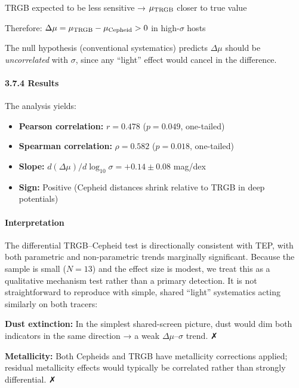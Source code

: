 \documentclass[
]{article}
\begin{document}
TRGB expected to be less sensitive → \(\mu_{\rm TRGB}\) closer to true
value

Therefore: \(\Delta\mu = \mu_{\rm TRGB} - \mu_{\rm Cepheid} > 0\) in
high-\(\sigma\) hosts

The null hypothesis (conventional systematics) predicts \(\Delta\mu\)
should be \emph{uncorrelated} with \(\sigma\), since any ``light''
effect would cancel in the difference.

\paragraph{3.7.4 Results}\label{results-1}

The analysis yields:

\begin{itemize}
\item
  \textbf{Pearson correlation:} \(r = 0.478\) (\(p = 0.049\),
  one-tailed)
\item
  \textbf{Spearman correlation:} \(\rho = 0.582\) (\(p = 0.018\),
  one-tailed)
\item
  \textbf{Slope:} \(d(\Delta\mu)/d\log_{10}\sigma = +0.14 \pm 0.08\)
  mag/dex
\item
  \textbf{Sign:} Positive (Cepheid distances shrink relative to TRGB in
  deep potentials)
\end{itemize}

\begin{quote}
\end{quote}

\paragraph{Interpretation}\label{interpretation}

The differential TRGB--Cepheid test is directionally consistent with
TEP, with both parametric and non-parametric trends marginally
significant. Because the sample is small (\(N=13\)) and the effect size
is modest, we treat this as a qualitative mechanism test rather than a
primary detection. It is not straightforward to reproduce with simple,
shared ``light'' systematics acting similarly on both tracers:

\textbf{Dust extinction:} In the simplest shared-screen picture, dust
would dim both indicators in the same direction → a weak
\(\Delta\mu\)--\(\sigma\) trend. ✗

\textbf{Metallicity:} Both Cepheids and TRGB have metallicity
corrections applied; residual metallicity effects would typically be
correlated rather than strongly differential. ✗
\end{document}
